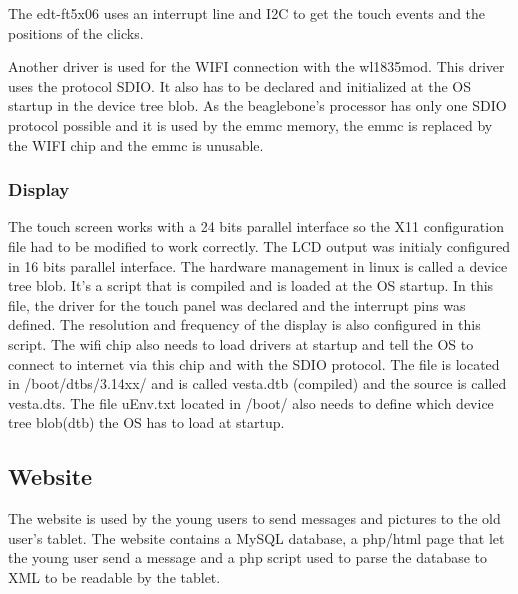 The edt-ft5x06 uses an interrupt line and I2C to get the touch events and the positions of the clicks.

Another driver is used for the WIFI connection with the wl1835mod. This driver uses the protocol SDIO. It also has to be declared and initialized at the OS startup in the device tree blob. As the beaglebone's processor has only one SDIO protocol possible and it is used by the emmc memory, the emmc is replaced by the WIFI chip and the emmc is unusable.

\subsubsection{Display}
The touch screen works with a 24 bits parallel interface so the X11 configuration file had to be modified to work correctly. The LCD output was initialy configured in 16 bits parallel interface.
The hardware management in linux is called a device tree blob. It’s a script that is compiled and is loaded at the OS startup. In this file, the driver for the touch panel was declared and the interrupt pins was defined. The resolution and frequency of the display is also configured in this script. The wifi chip also needs to load drivers at startup and tell the OS to connect to internet via this chip and with the SDIO protocol.
The file is located in /boot/dtbs/3.14xx/ and is called vesta.dtb (compiled) and the source is called vesta.dts. The file uEnv.txt located in /boot/ also needs to define which device tree blob(dtb) the OS has to load at startup.


\subsection{Website}

The website is used by the young users to send messages and pictures to the old user’s tablet.
The website contains a MySQL database, a php/html page that let the young user send a message and a php script used to parse the database to XML to be readable by the tablet.

